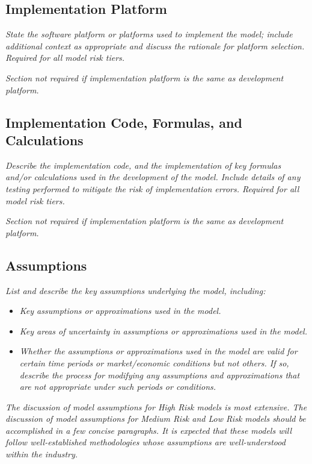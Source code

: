 \documentclass[12pt,letterpaper]{article}
\begin{document}
\subsection{Implementation Platform}
\textit{State the software platform or platforms used to implement the model; include additional context as appropriate and discuss the rationale for platform selection. Required for all model risk tiers.}

\textit{Section not required if implementation platform is the same as development platform.}

\subsection{Implementation Code, Formulas, and Calculations}
\textit{Describe the implementation code, and the implementation of key formulas and/or calculations used in the development of the model. Include details of any testing performed to mitigate the risk of implementation errors. Required for all model risk tiers.}

\textit{Section not required if implementation platform is the same as development platform.}

\subsection{Assumptions}
\textit{List and describe the key assumptions underlying the model, including:}
\begin{itemize}
\item \textit{Key assumptions or approximations used in the model.}
\item \textit{Key areas of uncertainty in assumptions or approximations used in the model.}
\item \textit{Whether the assumptions or approximations used in the model are valid for certain time periods or market/economic conditions but not others. If so, describe the process for modifying any assumptions and approximations that are not appropriate under such periods or conditions.}
\end{itemize}

\textit{The discussion of model assumptions for High Risk models is most extensive. The discussion of model assumptions for Medium Risk and Low Risk models should be accomplished in a few concise paragraphs. It is expected that these models will follow well-established methodologies whose assumptions are well-understood within the industry.}
\end{document}
